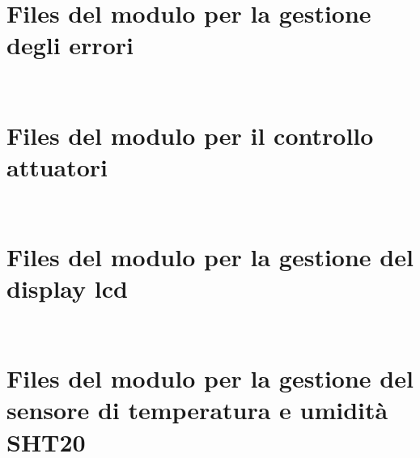 \newpage

\section{Files del modulo per la gestione degli errori}
\label{lst:error_h}
\inputminted{c++}{../programmi/firmware/lib/error/error.h}

\label{lst:error_cpp}
\inputminted{c++}{../programmi/firmware/lib/error/error.cpp}

\newpage

\section{Files del modulo per il controllo attuatori}
\label{lst:actuators_h}
\inputminted{c++}{../programmi/firmware/lib/actuators/actuators.h}

\label{lst:actuators_cpp}
\inputminted{c++}{../programmi/firmware/lib/actuators/actuators.cpp}

\newpage

\section{Files del modulo per la gestione del display lcd}
\label{lst:lcd_h}
\inputminted{c++}{../programmi/firmware/lib/lcd/lcd.h}

\label{lst:lcd_cpp}
\inputminted{c++}{../programmi/firmware/lib/lcd/lcd.cpp}

\newpage

\section{Files del modulo per la gestione del sensore di temperatura e umidità SHT20}
\label{lst:sht20_h}
\inputminted{c++}{../programmi/firmware/lib/sht20/sht20.h}

\label{lst:sht20_cpp}
\inputminted{c++}{../programmi/firmware/lib/sht20/sht20.cpp}

